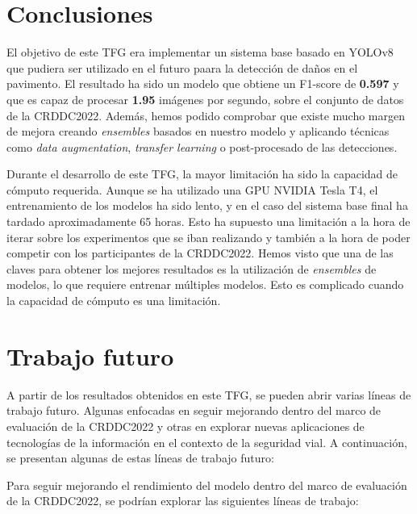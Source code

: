 
\section{Conclusiones\label{SEC:CONC}}
El objetivo de este TFG era implementar un sistema base basado en YOLOv8 que pudiera ser utilizado en el futuro paara la detección de daños en el pavimento. El resultado ha sido un modelo que obtiene un F1-score de \textbf{0.597} y que es capaz de procesar \textbf{1.95} imágenes por segundo, sobre el conjunto de datos de la CRDDC2022. Además, hemos podido comprobar que existe mucho margen de mejora creando \textit{ensembles} basados en nuestro modelo y aplicando técnicas como \textit{data augmentation}, \textit{transfer learning} o post-procesado de las detecciones.

Durante el desarrollo de este TFG, la mayor limitación ha sido la capacidad de cómputo requerida. Aunque se ha utilizado una GPU NVIDIA Tesla T4, el entrenamiento de los modelos ha sido lento, y en el caso del sistema base final ha tardado aproximadamente 65 horas. Esto ha supuesto una limitación a la hora de iterar sobre los experimentos que se iban realizando y también a la hora de poder competir con los participantes de la CRDDC2022. Hemos visto que una de las claves para obtener los mejores resultados es la utilización de \textit{ensembles} de modelos, lo que requiere entrenar múltiples modelos. Esto es complicado cuando la capacidad de cómputo es una limitación.


\section{Trabajo futuro\label{SEC:TRABFUT}}
A partir de los resultados obtenidos en este TFG, se pueden abrir varias líneas de trabajo futuro. Algunas enfocadas en seguir mejorando dentro del marco de evaluación de la CRDDC2022 y otras en explorar nuevas aplicaciones de tecnologías de la información en el contexto de la seguridad vial. A continuación, se presentan algunas de estas líneas de trabajo futuro:

Para seguir mejorando el rendimiento del modelo dentro del marco de evaluación de la CRDDC2022, se podrían explorar las siguientes líneas de trabajo:

